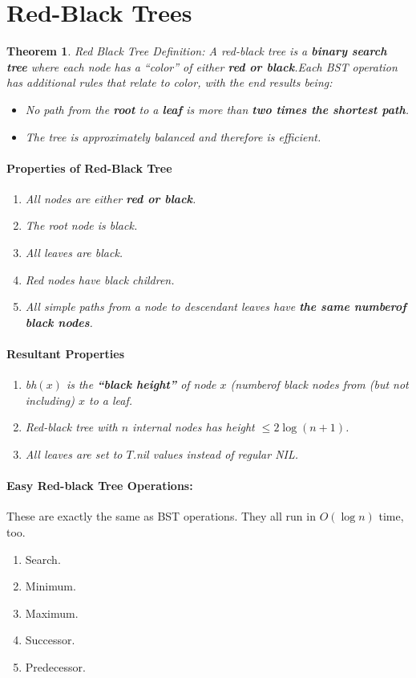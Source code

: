 \documentclass[a4paper,12pt]{report}
\newtheorem{theorem}{Theorem}
\begin{document}
\section{Red-Black Trees}

\begin{theorem}{Red Black Tree Definition:}
A red-black tree is a \textbf{binary search tree} where each node has a ``color'' of either \textbf{red or black}.Each BST operation has additional rules that relate to color, with the end results being:
\begin{itemize}
\item No path from the \textbf{root} to a \textbf{leaf} is more than \textbf{two times the shortest path}.
\item The tree is approximately balanced and therefore is efficient.
\end{itemize}

\paragraph{Properties of Red-Black Tree} 
\begin{enumerate}
\item All nodes are either \textbf{red or black}.
\item The root node is black.
\item All leaves are black.
\item Red nodes have black children.
\item All simple paths from a node to descendant leaves have \textbf{the same numberof black nodes}.
\end{enumerate}

\paragraph{Resultant Properties} 
\begin{enumerate}
\item bh$(x)$ is the \textbf{``black height''} of node $x$ (numberof black nodes from (but not including) $x$ to a leaf.
\item Red-black tree with $n$ internal nodes has height $\leq 2\log(n+1)$.
\item All leaves are set to $T$.nil values instead of regular NIL.
\end{enumerate}
\end{theorem}

\paragraph{Easy Red-black Tree Operations: } These are exactly the same as BST operations. They all run in $O(\log n)$ time, too.
\begin{enumerate}
\item Search.
\item Minimum.
\item Maximum.
\item Successor.
\item Predecessor. 
\end{enumerate}
\end{document}
